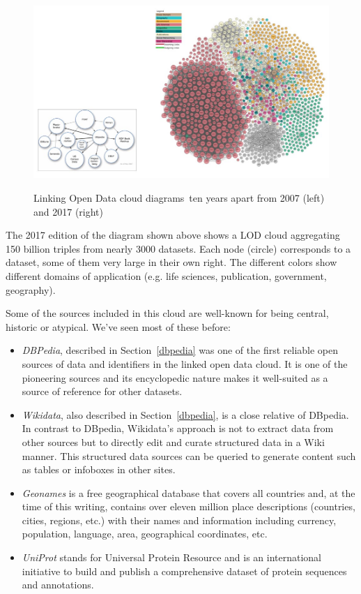 \begin{figure}
\includegraphics[width=5.0in]{media/ch5/figure-05-14.jpg}
\label{fig:ch5.14}
\caption{Linking Open Data cloud diagrams\protect\footnotemark\ ten years apart from 2007 (left) and 2017 (right)}
\end{figure}

The 2017 edition of the diagram shown above shows a LOD cloud
aggregating 150 billion triples from nearly 3000 datasets. Each node
(circle) corresponds to a dataset, some of them very large in their own
right. The different colors show different domains of application (e.g.
life sciences, publication, government, geography).

Some of the sources included in this cloud are well-known for being
central, historic or atypical.  We've seen most of these before:

\begin{itemize}
\item
  \emph{DBPedia}, described in Section~\ref{dbpedia} was one of the first reliable open sources
  of data and identifiers in
  the linked open data cloud. It is one of the pioneering sources and
  its encyclopedic nature makes it well-suited as a source of reference
  for other datasets.

\item
  \emph{Wikidata}, also described in Section~\ref{dbpedia}, is a close relative of DBpedia.  In contrast to
  DBpedia, Wikidata's approach is not to extract data
  from other sources but to directly edit and curate structured data in
  a Wiki manner.  This structured data sources can be queried to
  generate content such as tables or infoboxes in other sites. 

\item
  \emph{Geonames} is a free geographical database that covers all countries
  and, at the time of this writing, contains over eleven million place
  descriptions (countries, cities, regions, etc.) with their names and
  information including currency, population, language, area,
  geographical coordinates, etc.

\item
  \emph{UniProt} stands for Universal Protein Resource and is an international
  initiative to build and publish a comprehensive dataset of protein
  sequences and annotations.
\end{itemize}



